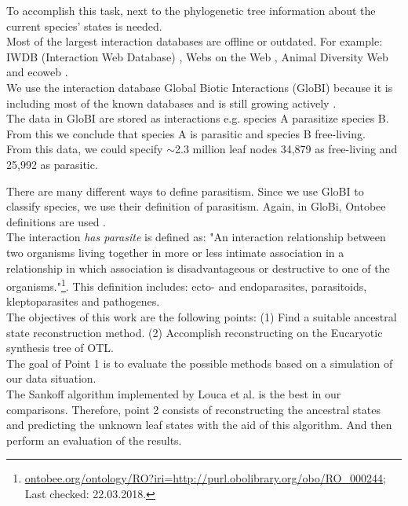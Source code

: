   To accomplish this task, next to the phylogenetic tree information about the current species' 
    states is needed. \\
  Most of the largest interaction databases are offline or outdated. For example: IWDB (Interaction 
    Web Database) \cite{IWDB2003}, Webs on the Web \cite{WOW2004}, Animal Diversity Web 
    \cite{Myers2003} and ecoweb \cite{Cohen2010}. \\
  We use the interaction database Global Biotic Interactions (GloBI) \cite{Poelen2014} because it is 
    including most of the known databases and is still growing actively \cite{Poelen2014}. \\
  The data in GloBI are stored as interactions e.g.  species A parasitize species B. From this we 
    conclude that species A is parasitic and species B free-living. \\
  From this data, we could specify $\sim$2.3 million leaf nodes 34,879 as free-living and 25,992 
    as parasitic. 

  There are many different ways to define parasitism. Since we use GloBI to classify species, we use 
    their definition of parasitism. Again, in GloBi, Ontobee definitions are used \cite{Xiang2011}. \\
  The interaction \textit{has parasite} is defined as: "An interaction relationship between two 
    organisms living together in more or less intimate association in a relationship in which 
    association is disadvantageous or destructive to one of the organisms."\footnote{
      \hyperlink{http://www.ontobee.org/ontology/RO?iri=http://purl.obolibrary.org/obo/RO_0002445}
      {ontobee.org/ontology/RO?iri=http://purl.obolibrary.org/obo/RO\_000244}; Last checked: 22.03.2018.
    }. This definition includes: ecto- and endoparasites, parasitoids, kleptoparasites and pathogenes. \\

  The objectives of this work are the following points: (1) Find a suitable ancestral state 
    reconstruction method. (2) Accomplish reconstructing on the Eucaryotic synthesis tree of OTL. \\
  The goal of Point 1 is to evaluate the possible methods based on a simulation of our data 
    situation. \\
  The Sankoff algorithm implemented by Louca et al. is the best in our comparisons. Therefore, 
    point 2 consists of reconstructing the ancestral states and predicting the unknown leaf states 
    with the aid of this algorithm. And then perform an evaluation of the results.

